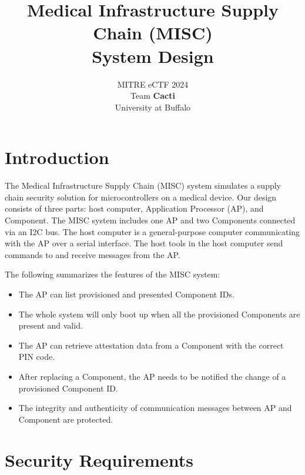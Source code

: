 \documentclass[11pt,oneside,onecolumn,letterpaper]{article}
\title{Medical Infrastructure Supply Chain (MISC) \\ System Design}
\author{MITRE eCTF 2024\\Team \textbf{Cacti}\\ University at Buffalo}
\date{}
\begin{document}
\normalsize


\maketitle

\renewcommand{\thepage}{System Design, Team Cacti, University at Buffalo--\arabic{page}}
\setcounter{page}{1} \normalsize
%

\newcommand{\flagRollback}{\textsf{Rollback}\xspace}

\section{Introduction}
The Medical Infrastructure Supply Chain (MISC) system simulates a supply chain security solution for microcontrollers on a medical device.
Our design consists of three parts: host computer, Application Processor (AP), and Component.
The MISC system includes one AP and two Components connected via an I2C bus.
The host computer is a general-purpose computer communicating with the AP over a serial interface.
The host tools in the host computer send commands to and receive messages from the AP.

The following summarizes the features of the MISC system:
\begin{itemize}
	\item The AP can list provisioned and presented Component IDs.
	\item The whole system will only boot up when all the provisioned Components are present and valid.
	\item The AP can retrieve attestation data from a Component with the correct PIN code.
	\item After replacing a Component,
	the AP needs to be notified the change of a provisioned Component ID.
	\item The integrity and authenticity of communication messages between AP and Component are protected.
\end{itemize}

\section{Security Requirements}
\end{document}
